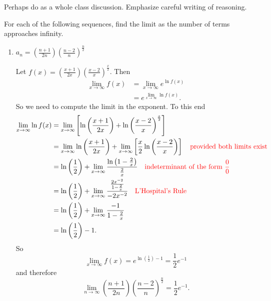 \documentclass[noinstructornotes]{ximera}
\begin{document}
\begin{instructorNotes}
Perhaps do as a whole class discussion.  
Emphasize careful writing of reasoning.
\end{instructorNotes}




\begin{problem}
For each of the following sequences, find the limit as the number of terms approaches infinity.
	\begin{enumerate}
	
	\item  $a_n = \left( \frac{n+1}{2n} \right) \left( \frac{n-2}{n} \right)^{\frac{n}{2}}$
	\begin{freeResponse}
	Let $f(x) =  \left( \frac{x+1}{2x} \right) \left( \frac{x-2}{x} \right)^{\frac{x}{2}}$.  
	Then
		\begin{align*}
		\lim_{x \to \infty} f(x) 
		&= \lim_{x \to \infty} e^{\ln f(x)}  \\
		&= e^{\lim_{x \to \infty} \ln f(x)}.
		\end{align*}
	So we need to compute the limit in the exponent.  To this end
		\begin{align*}
		\lim_{x \to \infty} \ln f(x) 
		&= \lim_{x \to \infty} \left[ \ln \left( \frac{x+1}{2x} \right) + \ln \left( \frac{x-2}{x} \right)^{\frac{x}{2}} \right]  \\
		&= \lim_{x \to \infty} \ln \left( \frac{x+1}{2x} \right) + \lim_{x \to \infty} \left[ \frac{x}{2} \ln \left( \frac{x-2}{x} \right) \right]  \quad {\color{red}\text{provided both limits exist}}  \\
		&= \ln \left( \frac{1}{2} \right) + \lim_{x \to \infty} \frac{\ln \left( 1 - \frac{2}{x} \right)}{\frac{2}{x}}  \quad {\color{red}\text{indeterminant of the form }\frac{0}{0}}\\
		&= \ln \left( \frac{1}{2} \right) + \lim_{x \to \infty} \frac{\frac{2x^{-2}}{1-\frac{2}{x}}}{-2x^{-2}}  \quad {\color{red}\text{L'Hospital's Rule}}  \\
		&= \ln \left( \frac{1}{2} \right) + \lim_{x \to \infty} \frac{-1}{1-\frac{2}{x}}  \\
		&= \ln \left( \frac{1}{2} \right) - 1.
		\end{align*}
	So 
		\[
		\lim_{x \to \infty} f(x) = e^{\ln \left( \frac{1}{2} \right) - 1} = \frac{1}{2} e^{-1}
		\]
	and therefore
		\[
		\lim_{n \to \infty} \left( \frac{n+1}{2n} \right) \left( \frac{n-2}{n} \right)^{\frac{n}{2}} = \frac{1}{2} e^{-1}.
		\]
	\end{freeResponse}
	

\end{enumerate}
\end{problem}
\end{document}
